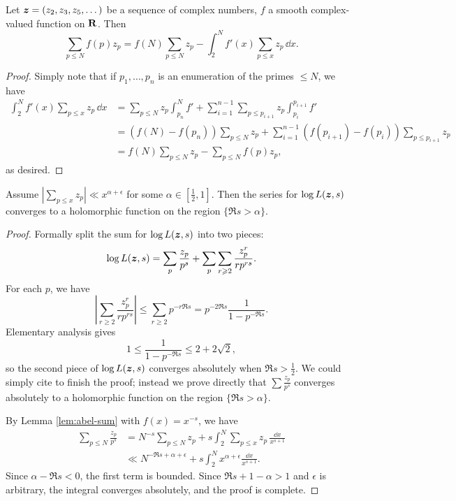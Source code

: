 \begin{lemma}\label{lem:abel-sum}
Let ${\boldsymbol z}=(z_2,z_3,z_5,\dots)$ be a sequence of complex numbers, $f$ a smooth 
complex-valued function on $\mathbf{R}$. Then 
\[
	\sum_{p\leqslant N} f(p) z_p = f(N) \sum_{p\leqslant N} z_p - \int_2^N f'(x) \sum_{p\leqslant x} z_p\, \dd x .
\]
\end{lemma}
\begin{proof}
Simply note that if $p_1,\dots,p_n$ is an enumeration of the primes 
$\leqslant N$, we have 
\begin{align*}
	\int_2^N f'(x) \sum_{p\leqslant x} z_p\, \dd x 
		&= \sum_{p\leqslant N} z_p \int_{p_n}^N f' + \sum_{i=1}^{n-1} \sum_{p\leqslant p_{i+1}} z_p \int_{p_i}^{p_{i+1}} f' \\
		&= (f(N) - f(p_n)) \sum_{p\leqslant N} z_p + \sum_{i=1}^{n-1} (f(p_{i+1}) - f(p_i)) \sum_{p\leqslant p_{i+1}} z_p \\
		&= f(N) \sum_{p\leqslant N} z_p - \sum_{p\leqslant N} f(p) z_p ,
\end{align*}
as desired. 
\end{proof}

\begin{theorem}\label{thm:AT->RH}
Assume $|\sum_{p\leqslant x} z_p| \ll x^{\alpha+\epsilon}$ for some 
$\alpha\in [\frac 1 2,1]$. Then the series for $\log L({\boldsymbol z},s)$ converges to a 
holomorphic function on the region $\{\Re s>\alpha\}$. 
\end{theorem}
\begin{proof}
Formally split the sum for $\log L({\boldsymbol z},s)$ into two pieces: 
\[
	\log L({\boldsymbol z},s) = \sum_p \frac{z_p}{p^s} + \sum_p \sum_{r\geqslant 2} \frac{z_p^r}{r p^{r s}} .
\]
For each $p$, we have 
\[
	\left| \sum_{r\geqslant 2} \frac{z_p^r}{r p^{r s}}\right| \leqslant \sum_{r\geqslant 2} p^{- r \Re s} = p^{-2 \Re s} \frac{1}{1-p^{-\Re s}} .
\]
Elementary analysis gives 
\[
	1 \leqslant \frac{1}{1-p^{-\Re s}} \leqslant 2 + 2\sqrt 2 ,
\]
so the second piece of $\log L({\boldsymbol z},s)$ converges absolutely when 
$\Re s>\frac 1 2$. We could simply cite \cite[II.1 Th.~10]{tenenbaum-1995} to 
finish the proof; 
instead we prove directly that $\sum \frac{z_p}{p^s}$ converges absolutely 
to a holomorphic function on the region $\{\Re s>\alpha\}$. 

By Lemma \ref{lem:abel-sum} with $f(x) = x^{-s}$, we have 
\begin{align*}
	\sum_{p\leqslant N} \frac{z_p}{p^s}
		&= N^{-s} \sum_{p\leqslant N} z_p + s \int_2^N \sum_{p\leqslant x} z_p\, \frac{\dd x}{x^{s+1}} \\
		&\ll N^{-\Re s + \alpha + \epsilon} + s \int_2^N x^{\alpha+\epsilon} \frac{\dd x}{x^{s+1}} .
\end{align*}
Since $\alpha-\Re s < 0$, the first term is bounded. Since 
$\Re s+1-\alpha > 1$ and 
$\epsilon$ is arbitrary, the integral converges absolutely, and the proof is 
complete. 
\end{proof}

